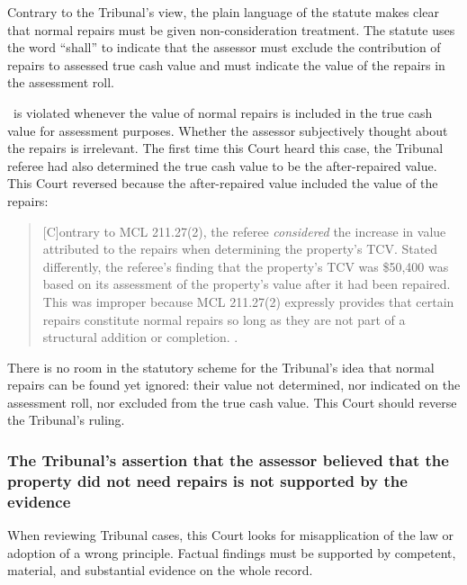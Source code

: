 \documentclass[12pt,\documentclassflag]{michiganCourtOfAppealsBrief}
\begin{document}
Contrary to the Tribunal's view, the plain language of the statute makes clear that normal repairs must be given non-consideration treatment. The statute uses the word ``shall'' to indicate that the assessor must exclude the contribution of repairs to assessed true cash value and must indicate the value of the repairs in the assessment roll.

\mathieuGast\ is violated whenever the value of normal repairs is included in the true cash value for assessment purposes. Whether the assessor subjectively thought about the repairs is irrelevant. The first time this Court heard this case, the Tribunal referee had also determined the true cash value to be the after-repaired value. This Court reversed because the after-repaired value included the value of the repairs:

\begin{quote}
[C]ontrary to MCL 211.27(2), the referee {\em considered} the increase in value attributed to the repairs when determining the property's TCV. Stated differently, the referee's finding that the property's TCV was \$50,400 was based on its assessment of the property's value after it had been repaired. This was improper because MCL 211.27(2) expressly provides that certain repairs constitute normal repairs so long as they are not part of a structural addition or completion. .
\end{quote}

There is no room in the statutory scheme for the Tribunal's idea that normal repairs can be found yet ignored: their value not determined, nor indicated on the assessment roll, nor excluded from the true cash value. This Court should reverse the Tribunal's ruling.


\subsubsection{The Tribunal's assertion that the assessor believed that the property did not need repairs is not supported by the evidence}
When reviewing Tribunal cases, this Court looks for misapplication of the law or adoption of a wrong principle. Factual findings must be supported by competent, material, and substantial evidence on the whole record. 
\end{document}
